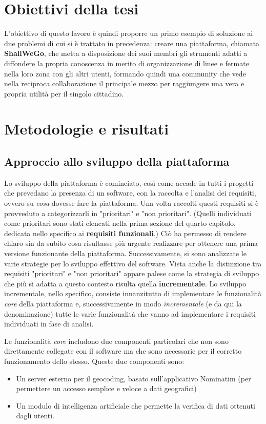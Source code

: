 \section{Obiettivi della tesi}
    L'obiettivo di questo lavoro è quindi proporre un primo esempio di soluzione ai due problemi di cui si è trattato in precedenza: creare una piattaforma, chiamata \textbf{ShallWeGo}, che metta a disposizione dei suoi membri gli strumenti adatti a diffondere la propria conoscenza in merito di organizzazione di linee e fermate nella loro zona con gli altri utenti, formando quindi una community che vede nella reciproca collaborazione il principale mezzo per raggiungere una vera e propria utilità per il singolo cittadino.

    
    
\section{Metodologie e risultati}
    \subsection{Approccio allo sviluppo della piattaforma}
        Lo sviluppo della piattaforma è cominciato, così come accade in tutti i progetti che prevedano la presenza di un software, con la raccolta e l'analisi dei requisiti, ovvero su \textit{cosa} dovesse fare la piattaforma. Una volta raccolti questi requisiti si è provveduto a categorizzarli in "prioritari" e "non prioritari". (Quelli individuati come prioritari sono stati elencati nella prima sezione del quarto capitolo, dedicata nello specifico ai \textbf{requisiti funzionali}.) Ciò ha permesso di rendere chiaro sin da subito cosa risultasse più urgente realizzare per ottenere una prima versione funzionante della piattaforma. 
        Successivamente, si sono analizzate le varie strategie per lo sviluppo effettivo del software. Vista anche la distinzione tra requisiti "prioritari" e "non prioritari" appare palese come la strategia di sviluppo che più si adatta a questo contesto risulta quella \textbf{incrementale}. Lo sviluppo incrementale, nello specifico, consiste innanzitutto di implementare le funzionalità \textit{core} della piattaforma e, successivamente in modo \textit{incrementale} (e da qui la denominazione) tutte le varie funzionalità che vanno ad implementare i requisiti individuati in fase di analisi. 
        
        Le funzionalità \textit{core} includono due componenti particolari che non sono direttamente collegate con il software ma che sono necessarie per il corretto funzionamento dello stesso. Queste due componenti sono:
        \begin{itemize}
            \item Un server esterno per il geocoding, basato sull'applicativo Nominatim (per permettere un accesso semplice e veloce a dati geografici)
            \item Un modulo di intelligenza artificiale che permette la verifica di dati ottenuti dagli utenti.
        \end{itemize}


